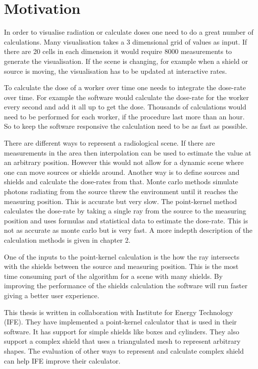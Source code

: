 \documentclass[11pt,twoside,a4paper]{report}
\begin{document}
\section{Motivation}
In order to visualise radiation or calculate doses one need to do a great number of calculations. Many visualisation takes a 3 dimensional grid of values as input. If there are 20 cells in each dimension it would require 8000 measurements to generate the visualisation. If the scene is changing, for example when a shield or source is moving, the visualisation has to be updated at interactive rates. 

To calculate the dose of a worker over time one needs to integrate the dose-rate over time. For example the software would calculate the dose-rate for the worker every second and add it all up to get the dose. Thousands of calculations would need to be performed for each worker, if the procedure last more than an hour. So to keep the software responsive the calculation need to be as fast as possible.

There are different ways to represent a radiological scene. If there are measurements in the area then interpolation can be used to estimate the value at an arbitrary position. However this would not allow for a dynamic scene where one can move sources or shields around. Another way is to define sources and shields and calculate the dose-rates from that. Monte carlo methods simulate photons radiating from the source threw the environment until it reaches the measuring position. This is accurate but very slow. The point-kernel method calculates the dose-rate by taking a single ray from the source to the measuring position and uses formulas and statistical data to estimate the dose-rate. This is not as accurate as monte carlo but is very fast. A more indepth description of the calculation methods is given in chapter 2.

One of the inputs to the point-kernel calculation is the how the ray intersects with the shields between the source and measuring position. This is the most time consuming part of the algorithm for a scene with many shields. By improving the performance of the shields calculation the software will run faster giving a better user experience.

This thesis is written in collaboration with Institute for Energy Technology (IFE). They have implemented a point-kernel calculator that is used in their software. It has support for simple shields like boxes and cylinders. They also support a complex shield that uses a triangulated mesh to represent arbitrary shapes. The evaluation of other ways to represent and calculate complex shield can help IFE improve their calculator.
\end{document}
